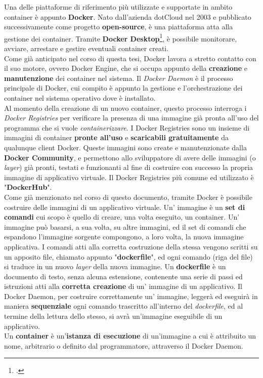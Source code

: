 Una delle piattaforme di riferimento più utilizzate e supportate in ambito container è appunto \textbf{Docker}. Nato dall'azienda dotCloud nel 2003 e pubblicato successivamente come progetto \textbf{\gls{open-source}}, è una piattaforma atta alla gestione dei container. Tramite \textbf{Docker Desktop}\footcite{presente solamente per le versioni Windows}, è possibile monitorare, avviare, arrestare e gestire eventuali container creati. \\
Come già anticipato nel corso di questa tesi, Docker lavora a stretto contatto con il suo motore, ovvero \gls{Docker Engine}, che si occupa appunto della \textbf{creazione} e \textbf{manutenzione} dei container nel sistema.
Il \textit{Docker Daemon} è il processo principale di Docker, cui compito è appunto la gestione e l'orchestrazione dei container nel sistema operativo dove è installato. \\
Al momento della creazione di un nuovo container, questo processo interroga i \textit{Docker Registries} per verificare la presenza di una immagine già pronta all'uso del programma che si vuole \textit{containerizzare}. I Docker Registries sono un insieme di immagini di container \textbf{pronte all'uso} e \textbf{scaricabili gratuitamente} da qualunque client Docker. Queste immagini sono create e manutenzionate dalla \textbf{Docker Community}, e permettono allo sviluppatore di avere delle immagini (o \textit{layer}) già pronti, testati e funzionanti al fine di costruire con successo la propria immagine di applicativo virtuale. Il Docker Registries più comune ed utilizzato è "\textbf{DockerHub}".\\
Come già menzionato nel corso di questo documento, tramite Docker è possibile costruire delle immagini di un applicativo virtuale. Un' immagine è un \textbf{set di comandi} cui scopo è quello di creare, una volta eseguito, un container. Un' immagine può basarsi, a sua volta, su altre immagini, ed il set di comandi che espandono l'immagine sorgente compongono, a loro volta, la nuova immagine applicativa. I comandi atti alla corretta costruzione della stessa vengono scritti su un apposito file, chiamato appunto "\textbf{dockerfile}", ed ogni comando (riga del file) si traduce in un nuovo \textit{layer} della nuova immagine. Un \textbf{dockerfile} è un documento di testo, senza alcuna estensione, contenente una serie di passi ed istruzioni atti alla \textbf{corretta creazione} di un' immagine di un applicativo. Il Docker Daemon, per costruire correttamente un' immagine, leggerà ed eseguirà in maniera \textbf{sequenziale} ogni comando trascritto all'interno del \textit{dockerfile}, ed al termine della lettura dello stesso, si avrà un'immagine eseguibile di un applicativo. \\
Un \textbf{container} è un'\textbf{istanza di esecuzione} di un'immagine a cui è attribuito un nome, arbitrario o definito dal programmatore, attraverso il Docker Daemon. 

